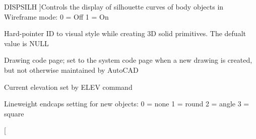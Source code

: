 \begin{Desc}
\begin{description}
{D\+I\+S\+P\+S\+I\+LH\hypertarget{class_c_a_d_header_abd894aab7aa85b4c4634e67fb93d6886a2531728e27a69698ebdab51abaca2caf}{}\label{class_c_a_d_header_abd894aab7aa85b4c4634e67fb93d6886a2531728e27a69698ebdab51abaca2caf}
}]Controls the display of silhouette curves of body objects in Wireframe mode\+: 0 = Off 1 = On \item[{\em 
D\+R\+A\+G\+VS\hypertarget{class_c_a_d_header_abd894aab7aa85b4c4634e67fb93d6886a3b1911bf3fcdd053b27fe718b71e317d}{}\label{class_c_a_d_header_abd894aab7aa85b4c4634e67fb93d6886a3b1911bf3fcdd053b27fe718b71e317d}
}]Hard-\/pointer ID to visual style while creating 3D solid primitives. The defualt value is N\+U\+LL \item[{\em 
D\+W\+G\+C\+O\+D\+E\+P\+A\+GE\hypertarget{class_c_a_d_header_abd894aab7aa85b4c4634e67fb93d6886a7d8393f3c06479f6db9a789ad6937bcf}{}\label{class_c_a_d_header_abd894aab7aa85b4c4634e67fb93d6886a7d8393f3c06479f6db9a789ad6937bcf}
}]Drawing code page; set to the system code page when a new drawing is created, but not otherwise maintained by Auto\+C\+AD \item[{\em 
E\+L\+E\+V\+A\+T\+I\+ON\hypertarget{class_c_a_d_header_abd894aab7aa85b4c4634e67fb93d6886a30f263bb82409f50d3738441dea6e207}{}\label{class_c_a_d_header_abd894aab7aa85b4c4634e67fb93d6886a30f263bb82409f50d3738441dea6e207}
}]Current elevation set by E\+L\+EV command \item[{\em 
E\+N\+D\+C\+A\+PS\hypertarget{class_c_a_d_header_abd894aab7aa85b4c4634e67fb93d6886a7b17b801f1c9f39f7f9f5c67be4fc5fc}{}\label{class_c_a_d_header_abd894aab7aa85b4c4634e67fb93d6886a7b17b801f1c9f39f7f9f5c67be4fc5fc}
}]Lineweight endcaps setting for new objects\+: 0 = none 1 = round 2 = angle 3 = square \item[{\em 
}
\end{description}
\end{Desc}
